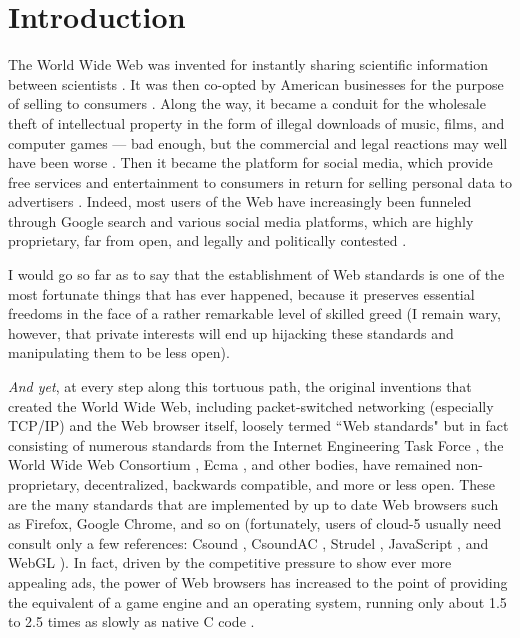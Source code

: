 \documentclass[runningheads,a4paper]{llncs}
\begin{document}
\section{Introduction}

The World Wide Web was invented for instantly sharing scientific information between scientists \cite{www}. It was then co-opted by American businesses for the purpose of selling to consumers \cite{gore}. Along the way, it became a conduit for the wholesale theft of intellectual property in the form of illegal downloads of music, films, and computer games --- bad enough, but the commercial and legal reactions may well have been worse \cite{freeculture}. Then it became the platform for social media, which provide free services and entertainment to consumers in return for selling personal data to advertisers \cite{socialmedia}. Indeed, most users of the Web have increasingly been funneled through Google search and various social media platforms, which are highly proprietary, far from open, and legally and politically contested \cite{surveillance}. 

I would go so far as to say that the establishment of Web standards is one of the most fortunate things that has ever happened, because it preserves essential freedoms in the face of a rather remarkable level of skilled greed (I remain wary, however, that private interests will end up hijacking these standards and manipulating them to be less open).

\emph{And yet}, at every step along this tortuous path, the original inventions that created the World Wide Web, including packet-switched networking (especially TCP/IP) and the Web browser itself, loosely termed ``Web standards" but in fact consisting of numerous standards from the Internet Engineering Task Force \cite{ietf}, the World Wide Web Consortium \cite{w3c}, Ecma \cite{ecma}, and other bodies, have remained non-proprietary, decentralized, backwards compatible, and more or less open. These are the many standards that are implemented by up to date Web browsers such as Firefox, Google Chrome, and so on \cite{html5test} (fortunately, users of cloud-5 usually need consult only a few references: Csound \cite{csoundreference} \cite{csoundapireference}, CsoundAC \cite{csoundacreference}, Strudel \cite{strudel}, JavaScript \cite{javascriptreference}, and WebGL \cite{webglreference}). In fact, driven by the competitive pressure to show ever more appealing ads, the power of Web browsers has increased to the point of providing the equivalent of a game engine and an operating system, running only about 1.5 to 2.5  times as slowly as native C code \cite{wasmspeed}.
\end{document}
